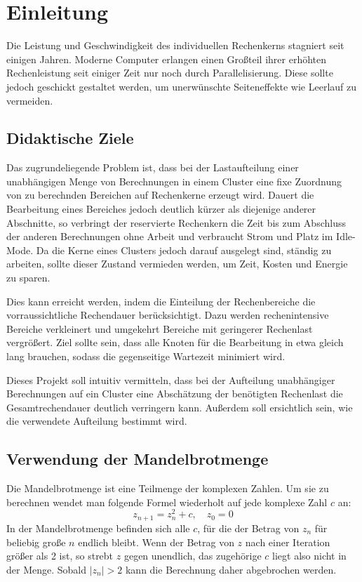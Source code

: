 \section{Einleitung}

Die Leistung und Geschwindigkeit des individuellen Rechenkerns stagniert seit einigen Jahren.
Moderne Computer erlangen einen Großteil ihrer erhöhten Rechenleistung
seit einiger Zeit nur noch durch Parallelisierung.
Diese sollte jedoch geschickt gestaltet werden, um unerwünschte Seiteneffekte
wie Leerlauf zu vermeiden.

\subsection{Didaktische Ziele}

Das zugrundeliegende Problem ist, dass bei der Lastaufteilung einer unabhängigen Menge
von Berechnungen in einem Cluster eine fixe Zuordnung von
zu berechnden Bereichen auf Rechenkerne erzeugt wird. Dauert die Bearbeitung eines Bereiches jedoch deutlich kürzer
als diejenige anderer Abschnitte, so verbringt der reservierte Rechenkern die Zeit bis zum Abschluss der anderen Berechnungen
ohne Arbeit und verbraucht Strom und Platz im Idle-Mode. Da die Kerne eines Clusters jedoch darauf ausgelegt sind, ständig zu arbeiten, sollte dieser Zustand vermieden
werden, um Zeit, Kosten und Energie zu sparen.

Dies kann erreicht werden, indem die Einteilung der Rechenbereiche die vorraussichtliche Rechendauer berücksichtigt.
Dazu werden rechenintensive Bereiche verkleinert und umgekehrt Bereiche mit geringerer Rechenlast vergrößert.
Ziel sollte sein, dass alle Knoten für die Bearbeitung in etwa gleich lang brauchen,
sodass die gegenseitige Wartezeit minimiert wird.

Dieses Projekt soll intuitiv vermitteln, dass bei der Aufteilung unabhängiger
Berechnungen auf ein Cluster eine Abschätzung der benötigten Rechenlast die Gesamtrechendauer deutlich verringern kann.
Außerdem soll ersichtlich sein, wie die verwendete Aufteilung bestimmt wird.

\subsection{Verwendung der Mandelbrotmenge}

Die Mandelbrotmenge ist eine Teilmenge der komplexen Zahlen. 
Um sie zu berechnen wendet man folgende Formel wiederholt auf jede komplexe Zahl $c$ an:
\begin{equation}
    z_{n+1} = z_{n}^2 + c, \quad z_0 = 0
\end{equation}
In der Mandelbrotmenge befinden sich alle $c$, für die der Betrag von $z_n$ für beliebig große $n$ endlich bleibt.
Wenn der Betrag von $z$ nach einer Iteration größer als 2 ist, so strebt $z$ gegen unendlich, das zugehörige $c$ liegt also nicht in der Menge.
Sobald $|z_n| > 2$ kann die Berechnung daher abgebrochen werden.

